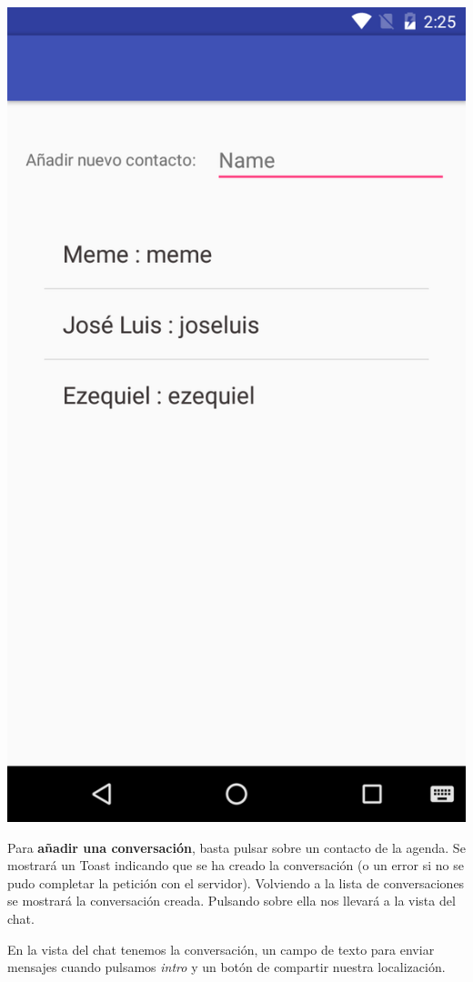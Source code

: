 \documentclass[]{article}
\begin{document}
\begin{center}
	\includegraphics[width=0.35\linewidth]{images/agendacontactos.png}
\end{center}

\hfill

Para \textbf{añadir una conversación}, basta pulsar sobre un contacto de la agenda. Se mostrará un Toast indicando que se ha creado la conversación (o un error si no se pudo completar la petición con el servidor). Volviendo a la lista de conversaciones se mostrará la conversación creada. Pulsando sobre ella nos llevará a la vista del chat.

\hfill

En la vista del chat tenemos la conversación, un campo de texto para enviar mensajes cuando pulsamos \textit{intro} y un botón de compartir nuestra localización.
\end{document}
